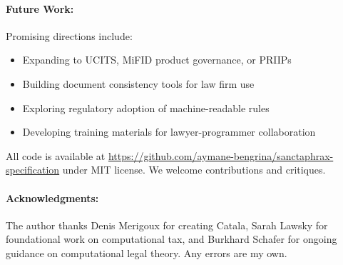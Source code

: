 \paragraph{Future Work:} Promising directions include:
\begin{itemize}
  \item Expanding to UCITS, MiFID product governance, or PRIIPs
  \item Building document consistency tools for law firm use
  \item Exploring regulatory adoption of machine-readable rules
  \item Developing training materials for lawyer-programmer collaboration
\end{itemize}

All code is available at \url{https://github.com/aymane-bengrina/sanctaphrax-specification} under MIT license. We welcome contributions and critiques.

\paragraph{Acknowledgments:} The author thanks Denis Merigoux for creating Catala, Sarah Lawsky for foundational work on computational tax, and Burkhard Schafer for ongoing guidance on computational legal theory. Any errors are my own.
